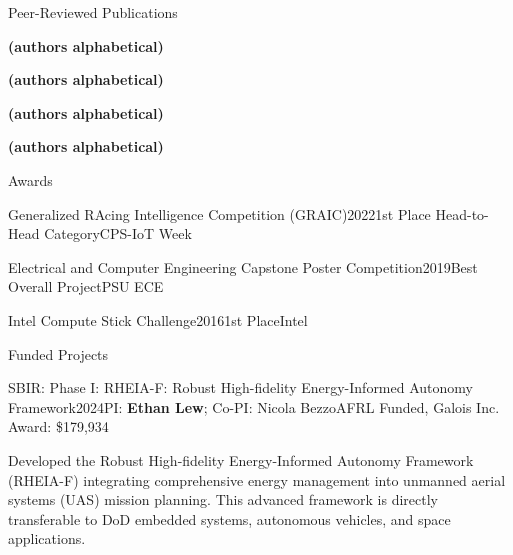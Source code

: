 \documentclass{resume}
\begin{document}
\begin{rSection}{Peer-Reviewed Publications}

\textbf{(authors alphabetical)} 


\textbf{(authors alphabetical)} 

\textbf{(authors alphabetical)} 




\textbf{(authors alphabetical)} 

\end{rSection}

\begin{rSection}{Awards}
\begin{rSubsectionEmpty}{Generalized RAcing Intelligence Competition (GRAIC)}{2022}{1st Place Head-to-Head Category}{CPS-IoT Week}
\end{rSubsectionEmpty}

\begin{rSubsectionEmpty}{Electrical and Computer Engineering Capstone Poster Competition}{2019}{Best Overall Project}{PSU ECE}
\end{rSubsectionEmpty}

\begin{rSubsectionEmpty}{Intel Compute Stick Challenge}{2016}{1st Place}{Intel}
\end{rSubsectionEmpty}
\end{rSection}

\begin{rSection}{Funded Projects}
\begin{rSubsection}{SBIR: Phase I: RHEIA-F: Robust High-fidelity Energy-Informed Autonomy Framework}{2024}{PI: \textbf{Ethan Lew}; Co-PI: Nicola Bezzo}{AFRL Funded, Galois Inc. Award: \$179,934}
\item Developed the Robust High-fidelity Energy-Informed Autonomy Framework (RHEIA-F) integrating comprehensive energy management into unmanned aerial systems (UAS) mission planning. This advanced framework is directly transferable to DoD embedded systems, autonomous vehicles, and space applications.
\end{rSubsection}
\end{rSection}


\end{document}
